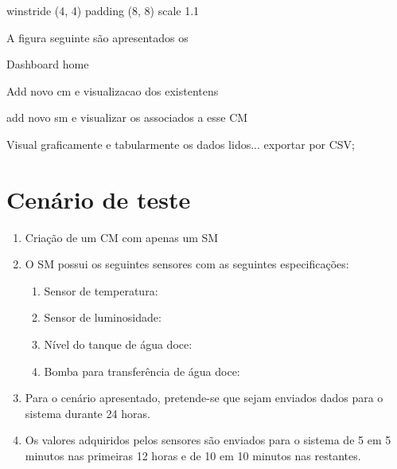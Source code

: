 winstride (4, 4)
padding (8, 8)
scale  1.1









A figura seguinte são apresentados os 


Dashboard home

Add novo cm e visualizacao dos existentens

add novo sm e visualizar os associados a esse CM

Visual graficamente e tabularmente os dados lidos... exportar por CSV; 





\section{Cenário de teste}

\begin{enumerate}
	\item Criação de um \acl{CM} com apenas um \acl{SM}
	
	\item O \acl{SM} possui os seguintes sensores com as seguintes especificações: 
	
	\begin{enumerate}
		\item Sensor de temperatura: 
		\item Sensor de luminosidade: 
		\item Nível do tanque de água doce: 
		\item Bomba para transferência de água doce: 
	\end{enumerate}
	
	\item Para o cenário apresentado, pretende-se que sejam enviados dados para o sistema durante 24 horas. 
	
	\item Os valores adquiridos pelos sensores são enviados para o sistema de 5 em 5 minutos nas primeiras 12 horas e de 10 em 10 minutos nas restantes. 

	
\end{enumerate}


\newpage






